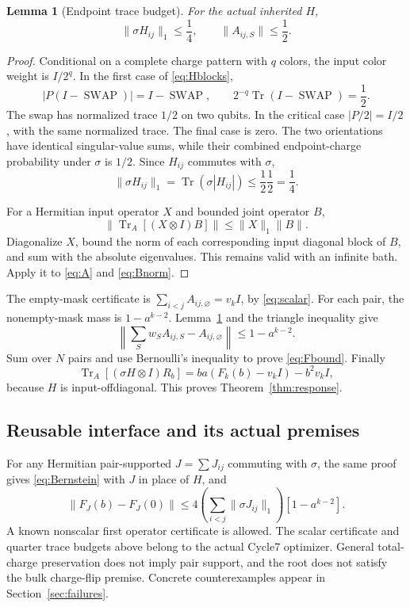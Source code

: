 \documentclass[11pt]{article}
\newtheorem{lemma}[theorem]{Lemma}
\newcommand{\Tr}{\operatorname{Tr}}
\newcommand{\norm}[1]{\lVert #1\rVert}
\newcommand{\SWAP}{\operatorname{SWAP}}
\begin{document}
\begin{lemma}[Endpoint trace budget]\label{lem:trace}
For the actual inherited \(H\),
\[
 \norm{\sigma H_{ij}}_1\le\frac14,\qquad
 \norm{A_{ij,S}}\le\frac12.
\]
\end{lemma}
\begin{proof}
Conditional on a complete charge pattern with \(q\) colors, the input
color weight is \(I/2^q\). In the first case of \eqref{eq:Hblocks},
\[
 |P(I-\SWAP)|=I-\SWAP,\qquad
 2^{-q}\Tr(I-\SWAP)=\frac12.
\]
The swap has normalized trace \(1/2\) on two qubits. In the critical
case \(|P/2|=I/2\), with the same normalized trace. The final case is
zero. The two orientations have identical singular-value sums, while
their combined endpoint-charge probability under \(\sigma\) is \(1/2\).
Since \(H_{ij}\) commutes with \(\sigma\),
\[
 \norm{\sigma H_{ij}}_1
 =\Tr(\sigma|H_{ij}|)\le\frac12\frac12=\frac14.
\]

For a Hermitian input operator \(X\) and bounded joint operator \(B\),
\[
 \norm{\Tr_A[(X\otimes I)B]}\le\norm X_1\norm B.
\]
Diagonalize \(X\), bound the norm of each corresponding input diagonal
block of \(B\), and sum with the absolute eigenvalues. This remains valid
with an infinite bath. Apply it to \eqref{eq:A} and \eqref{eq:Bnorm}.
\end{proof}

The empty-mask certificate is
\(\sum_{i<j}A_{ij,\varnothing}=v_kI\), by \eqref{eq:scalar}.
For each pair, the nonempty-mask mass is \(1-a^{k-2}\).
Lemma~\ref{lem:trace} and the triangle inequality give
\[
 \left\|\sum_Sw_S A_{ij,S}-A_{ij,\varnothing}\right\|
 \le1-a^{k-2}.
\]
Sum over \(N\) pairs and use Bernoulli's inequality to prove
\eqref{eq:Fbound}. Finally
\[
 \Tr_A[(\sigma H\otimes I)R_b]
 =ba(F_k(b)-v_kI)-b^2v_kI,
\]
because \(H\) is input-offdiagonal. This proves
Theorem~\ref{thm:response}.

\subsection{Reusable interface and its actual premises}

For any Hermitian pair-supported \(J=\sum J_{ij}\) commuting with
\(\sigma\), the same proof gives \eqref{eq:Bernstein} with \(J\) in place
of \(H\), and
\[
 \norm{F_J(b)-F_J(0)}
 \le4\!\left(\sum_{i<j}\norm{\sigma J_{ij}}_1\right)
      [1-a^{k-2}].
\]
A known nonscalar first operator certificate is allowed. The scalar
certificate and quarter trace budgets above belong to the actual Cycle7
optimizer. General total-charge preservation does not imply pair support,
and the root does not satisfy the bulk charge-flip premise. Concrete
counterexamples appear in Section~\ref{sec:failures}.
\end{document}
